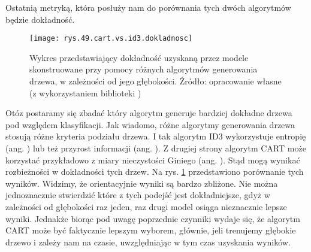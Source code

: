 Ostatnią metryką, która posłuży nam do porównania tych dwóch algorytmów będzie dokładność. 
\begin{figure}[h]
    \centering
    \texttt{[image: rys.49.cart.vs.id3.dokladnosc]}
    \caption{Wykres przedstawiający dokładność uzyskaną przez modele skonstruowane przy pomocy różnych algorytmów generowania drzewa, w zależności od jego głębokości. Źródło: opracowanie własne (z wykorzystaniem biblioteki )}
    \label{rys.49.cart.vs.id3.dokladnosc}
\end{figure}
Otóz postaramy się zbadać który algorytm generuje bardziej dokładne drzewa pod względem klasyfikacji. 
Jak wiadomo, różne algorytmy generowania drzewa stosują różne kryteria podziału drzewa. I tak algorytm ID3 wykorzystuje entropię (ang. ) lub też przyrost informacji (ang. ). Z drugiej strony algorytm CART może korzystać przykładowo z miary nieczystości Giniego (ang. ). Stąd mogą wynikać rozbieżności w dokładności tych drzew. Na rys. \ref{rys.49.cart.vs.id3.dokladnosc} przedstawiono porównanie tych wyników. 
Widzimy, że orientacyjnie wyniki są bardzo zbliżone. Nie można jednoznacznie stwierdzić które z tych podejść jest dokładniejsze, gdyż w zależności od głębokości raz jeden, raz drugi model osiąga nieznacznie lepsze wyniki. Jednakże biorąc pod uwagę poprzednie czynniki wydaje się, że algorytm CART może być faktycznie lepszym wyborem, głównie, jeli trenujemy głębokie drzewo i zależy nam na czasie, uwzględniając w tym czas uzyskania wyników.

